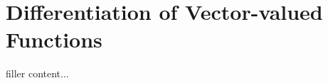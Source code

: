 \section{Differentiation of Vector-valued Functions}\label{sec:differentiation-of-vector-valued-functions}

filler content...

